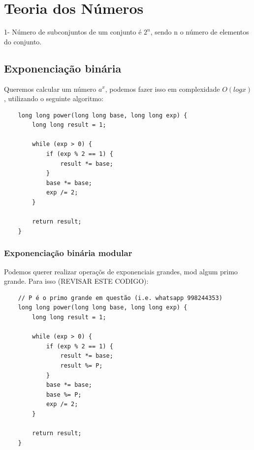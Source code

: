 \section{Teoria dos Números}
1- Número de subconjuntos de um conjunto é $2^n$, sendo n o número de elementos do conjunto.
\subsection{Exponenciação binária}
Queremos calcular um número $a^x$, podemos fazer isso em complexidade $O(logx)$, utilizando o seguinte algoritmo:
\begin{verbatim}
    long long power(long long base, long long exp) {
        long long result = 1;
    
        while (exp > 0) {
            if (exp % 2 == 1) {
                result *= base;
            }
            base *= base;
            exp /= 2;
        }
    
        return result;
    }

\end{verbatim}
\subsubsection{Exponenciação binária modular}
\par Podemos querer realizar operaçõs de exponenciais grandes, mod algum primo grande. Para isso (REVISAR ESTE CODIGO):
\begin{verbatim}
    // P é o primo grande em questão (i.e. whatsapp 998244353)
    long long power(long long base, long long exp) {
        long long result = 1;
    
        while (exp > 0) {
            if (exp % 2 == 1) {
                result *= base;
                result %= P;
            }
            base *= base;
            base %= P;
            exp /= 2;
        }
    
        return result;
    }
\end{verbatim}
